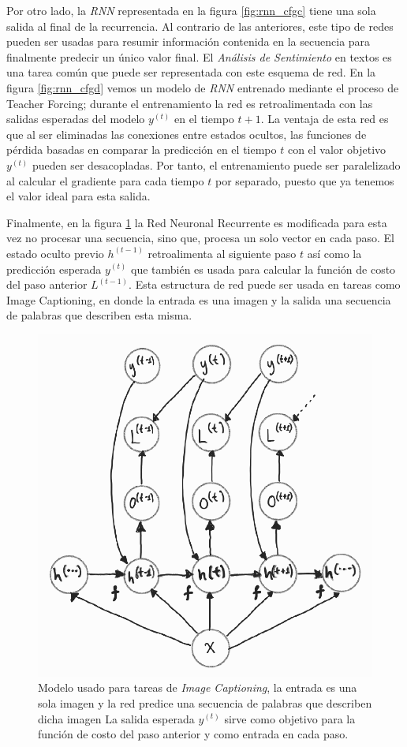 Por otro lado, la \textit{RNN} representada en la figura \ref{fig:rnn_cfgc} tiene una sola salida al
final de la recurrencia.
Al contrario de las anteriores, este tipo de redes pueden ser usadas para resumir
información contenida en la secuencia para finalmente predecir un único valor final.
El \textit{Análisis de Sentimiento} en textos es una tarea común que puede ser representada con este esquema
de red. En la figura \ref{fig:rnn_cfgd} vemos un modelo de \textit{RNN} entrenado mediante el proceso de
Teacher Forcing; durante el entrenamiento la red es retroalimentada con las salidas
esperadas del modelo $y^{(t)}$ en el tiempo $t+1$. La ventaja de esta red es que al ser eliminadas
las conexiones entre estados ocultos, las funciones de pérdida basadas en comparar la predicción en
el tiempo $t$ con el valor objetivo $y^{(t)}$ pueden ser desacopladas. Por tanto, el entrenamiento
puede ser paralelizado al calcular el gradiente para cada tiempo $t$ por separado, puesto que ya
tenemos el valor ideal para esta salida.

Finalmente, en la figura \ref{fig:rnn_cfge} la Red Neuronal Recurrente es modificada para esta vez
no procesar una secuencia, sino que, procesa un solo vector en cada paso. El estado oculto
previo $h^{(t-1)}$ retroalimenta al siguiente paso $t$ así como la predicción esperada $y^{(t)}$ que
también es usada para calcular la función de costo del paso anterior $L^{(t-1)}$. Esta estructura de
red puede ser usada en tareas como Image Captioning, en donde la entrada es una imagen y la salida
una secuencia de palabras que describen esta misma.

\begin{figure}[h!]
\centering
\includegraphics[width=.4\textwidth]{Chapters/1. Transformer/Figures/rnn/rnn_cfge.png}
\caption[RNN - Image Captioning]{Modelo usado para tareas de \textit{Image Captioning}, la entrada es una
sola imagen y la red predice una secuencia de palabras que describen dicha imagen La salida esperada
$y^{(t)}$ sirve como objetivo para la función de costo del paso anterior y como entrada en cada paso.}
\label{fig:rnn_cfge}
\end{figure}


